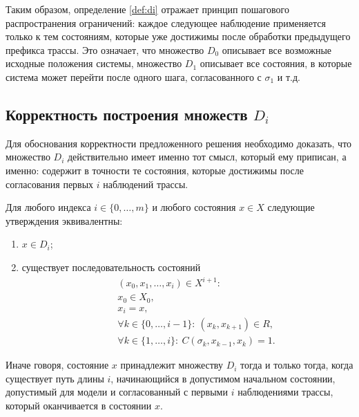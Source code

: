 Таким образом, определение \ref{def:di} отражает принцип пошагового
распространения ограничений: каждое следующее наблюдение применяется только к
тем состояниям, которые уже достижимы после обработки предыдущего префикса
трассы. Это означает, что множество $D_0$ описывает все возможные исходные
положения системы, множество $D_1$ описывает все состояния, в которые система
может перейти после одного шага, согласованного с $\sigma_1$ и т.д.

\subsection{Корректность построения множеств $D_i$}

Для обоснования корректности предложенного решения необходимо доказать, что
множество $D_i$ действительно имеет именно тот смысл, который ему приписан,
а именно: содержит в точности те состояния, которые достижимы после
согласования первых $i$ наблюдений трассы.

\begin{proposition}\label{prop:Di}
Для любого индекса $i \in \{0,\dots,m\}$ и любого состояния $x \in X$
следующие утверждения эквивалентны:
\begin{enumerate}[leftmargin=0pt,itemindent=4.6em]
    \item $x \in D_i$;
    \item существует последовательность состояний
     \[
     \begin{aligned}
     &\quad(x_0,x_1,\dots,x_i)\in X^{i+1} :\\
     &\quad x_0\in X_0,\\
     &\quad x_i = x,\\
     &\quad\forall k\in\{0,\dots,i-1\}:\ (x_k,x_{k+1})\in R,\\
     &\quad\forall k\in\{1,\dots,i\}:\ C(\sigma_k,x_{k-1},x_k)=1.
     \end{aligned}
     \]
\end{enumerate}
\end{proposition}

Иначе говоря, состояние $x$ принадлежит множеству $D_i$ тогда и только тогда,
когда существует путь длины $i$, начинающийся в допустимом начальном состоянии,
допустимый для модели и согласованный с первыми $i$ наблюдениями трассы,
который оканчивается в состоянии $x$.

